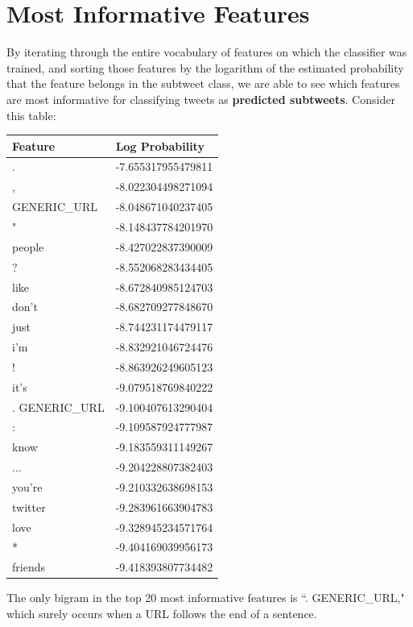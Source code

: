 \documentclass[11pt, twoside, reqno]{book}
\begin{document}
\section{Most Informative Features}
\label{most_informative_features}

By iterating through the entire vocabulary of features on which the classifier was trained, and sorting those features by the logarithm of the estimated probability that the feature belongs in the subtweet class, we are able to see which features are most informative for classifying tweets as \textbf{predicted subtweets}. Consider this table:

\begin{center}
\begin{tabular}{ | p{8em} | p{9em} | }
\hline
Feature & Log Probability    \\ \hline
.       & -7.655317955479811 \\
,       & -8.022304498271094 \\
GENERIC\_URL& -8.048671040237405 \\
"       & -8.148437784201970 \\
people  & -8.427022837390009 \\
?       & -8.552068283434405 \\
like    & -8.672840985124703 \\
don't   & -8.682709277848670 \\
just    & -8.744231174479117 \\
i'm     & -8.832921046724476 \\
!       & -8.863926249605123 \\
it's    & -9.079518769840222 \\
. GENERIC\_URL   & -9.100407613290404 \\
:       & -9.109587924777987 \\
know    & -9.183559311149267 \\
...     & -9.204228807382403 \\
you're  & -9.210332638698153 \\
twitter & -9.283961663904783 \\
love    & -9.328945234571764 \\
*       & -9.404169039956173 \\
friends & -9.418393807734482 \\
\hline
\end{tabular}
\end{center}

\noindent
The only bigram in the top 20 most informative features is ``. GENERIC\_URL," which surely occurs when a URL follows the end of a sentence.
\end{document}
